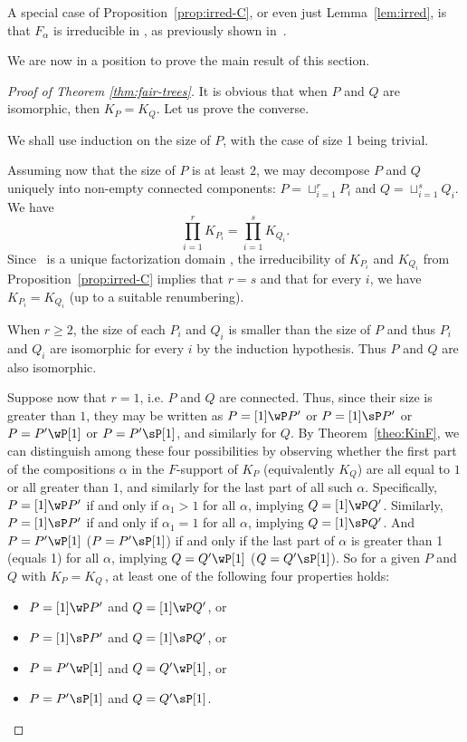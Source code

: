 \begin{remark}
A special case of Proposition~\ref{prop:irred-C}, or even just Lemma~\ref{lem:irred}, is that $F_\alpha$ is irreducible in \qsym, as previously shown in~\cite{LaPy08}.
\end{remark}

We are now in a position to prove the main result of this section.  

\begin{proof}[Proof of Theorem \ref{thm:fair-trees}]
It is obvious that when $P$ and $Q$ are isomorphic, then $K_P=K_Q$.
Let us prove the converse.

We shall use induction on the size of $P$, with the case of size 1 being trivial.

Assuming now that the size of $P$ is at least $2$, 
we may decompose $P$ and $Q$ uniquely into non-empty
connected components:
$P=\sqcup_{i=1}^r P_i$
and
$Q=\sqcup_{i=1}^s Q_i$.
We have
\[
\prod_{i=1}^r K_{P_i}
=
\prod_{i=1}^s K_{Q_i}.
\]
Since \qsym\  is a unique factorization domain \cite{Haz01,LaPy08,MaRe95}, 
the irreducibility of $K_{P_i}$ and $K_{Q_i}$ from Proposition~\ref{prop:irred-C} 
implies that $r=s$ and that for every $i$, we have $K_{P_i} = K_{Q_i}$ (up to a suitable renumbering).

When $r \ge 2$, the size of each $P_i$ and $Q_i$ is smaller than the size of $P$
and thus $P_i$ and $Q_i$ are isomorphic for every $i$ by the induction hypothesis. 
Thus $P$ and $Q$ are also isomorphic. 

Suppose now that $r = 1$, i.e. $P$ and $Q$ are connected. Thus, 
since their size is greater than $1$, they may be written as
$P=[1]\wP P'$ or $P=[1]\sP P'$
or
$P=P'\wP [1]$ or $P=P' \sP [1]$,
and similarly for $Q$.
By Theorem~\ref{theo:KinF}, we can distinguish among these four possibilities by observing whether the first part of the compositions $\alpha$ in the $F$-support of $K_P$ (equivalently $K_Q$) are all equal to $1$ or all greater than $1$, and similarly for the last part of all such $\alpha$. Specifically, $P=[1]\wP P'$ if and only if $\alpha_1 > 1$ for all $\alpha$, implying $Q=[1]\wP Q'$.  Similarly, $P=[1]\sP P'$ if and only if $\alpha_1=1$ for all $\alpha$, implying $Q=[1]\sP Q'$.  And $P=P'\wP [1]$ (\resp $P=P' \sP [1]$) if and only if the last part of $\alpha$ is greater than 1 (\resp equals 1) for all $\alpha$, implying $Q=Q'\wP [1]$ (\resp $Q=Q' \sP [1]$).  
So for a given $P$ and $Q$ with $K_P = K_Q$\,, at least one of the following four properties holds:
\begin{itemize}
\item $P=[1]\wP P'$ and $Q=[1]\wP Q'$, or 
\item $P=[1]\sP P'$ and $Q=[1]\sP Q'$, or
\item $P=P'\wP [1]$ and $Q=Q'\wP [1]$, or 
\item $P=P'\sP [1]$ and $Q=Q'\sP [1]$.
\end{itemize}


\end{proof}
